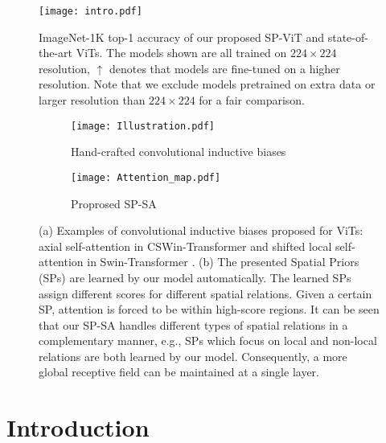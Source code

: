 \documentclass[authorversion, sigconf, acmthm=false, nonacm=true]{acmart}
\begin{document}
\maketitle
 \pagestyle{plain}

\begin{figure}[t]
  \centering
  \texttt{[image: intro.pdf]} \caption{ImageNet-1K top-1 accuracy of our proposed SP-ViT and state-of-the-art ViTs. 
  The models shown are all trained on $224\times224$ resolution, $\uparrow$ denotes that models are fine-tuned on a higher resolution.
  Note that we exclude models pretrained on extra data or larger resolution than $224\times224$ for a fair comparison.
} 
  \label{fig:intro}
\end{figure}

\begin{figure*}[t]
  \centering
  \begin{subfigure}[b]{0.56\textwidth}
      \texttt{[image: Illustration.pdf]}
      \caption{Hand-crafted convolutional inductive biases}
      \label{rfidtest_xaxis}
  \end{subfigure}
  \begin{subfigure}[b]{0.42\textwidth}
      \texttt{[image: Attention\_map.pdf]}
      \caption{Proprosed SP-SA}
      \label{rfidtest_xaxis}
  \end{subfigure}
  \caption{(a) Examples of convolutional inductive biases proposed for ViTs: axial self-attention in CSWin-Transformer \cite{dong2021cswin} and shifted local self-attention in Swin-Transformer \cite{liu2021swin}.
  (b) The presented Spatial Priors (SPs) are learned by our model automatically. The learned SPs
  assign different scores for different spatial relations. Given a certain SP, attention is forced to be within high-score regions. 
  It can be seen that our SP-SA handles different types of spatial relations in a complementary manner, e.g., SPs which focus on local and non-local relations are both learned by our model. 
  Consequently, a more global receptive field can be maintained at a single layer.}
\label{fig1}
\end{figure*}
\section{Introduction}
\label{sec:intro}
\end{document}
